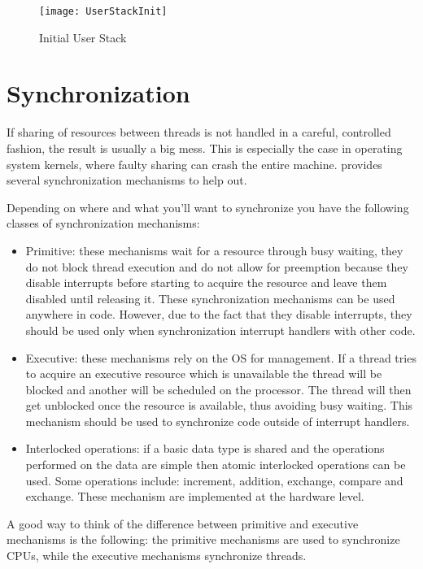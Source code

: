 \begin{appendices}
\begin{figure}
	\centering
	\texttt{[image: UserStackInit]}
		\caption{Initial User Stack}
	\label{fig:UserStackInit}
\end{figure}

\section{Synchronization}
\label{sect:Synch}

If sharing of resources between threads is not handled in a careful, controlled fashion, the result
is usually a big mess. This is especially the case in operating system kernels, where faulty sharing
can crash the entire machine. \projectname provides several synchronization mechanisms to help out.

Depending on where and what you'll want to synchronize you have the following classes of
synchronization mechanisms:
\begin{itemize}
	\item Primitive: these mechanisms wait for a resource through busy waiting, they do not block
thread execution and do not allow for preemption because they disable interrupts before starting to
acquire the resource and leave them disabled until releasing it. These synchronization mechanisms
can be used anywhere in code. However, due to the fact that they disable interrupts, they should
be used only when synchronization interrupt handlers with other code.

	\item Executive: these mechanisms rely on the OS for management. If a thread tries to acquire
an executive resource which is unavailable the thread will be blocked and another will be scheduled
on the processor. The thread will then get unblocked once the resource is available, thus avoiding
busy waiting. This mechanism should be used to synchronize code outside of interrupt handlers.

	\item Interlocked operations: if a basic data type is shared and the operations performed on the
data are simple then atomic interlocked operations can be used. Some operations include: increment,
addition, exchange, compare and exchange. These mechanism are implemented at the hardware level.
\end{itemize}

A good way to think of the difference between primitive and executive mechanisms is the following:
the primitive mechanisms are used to synchronize CPUs, while the executive mechanisms synchronize
threads.


\end{appendices}
